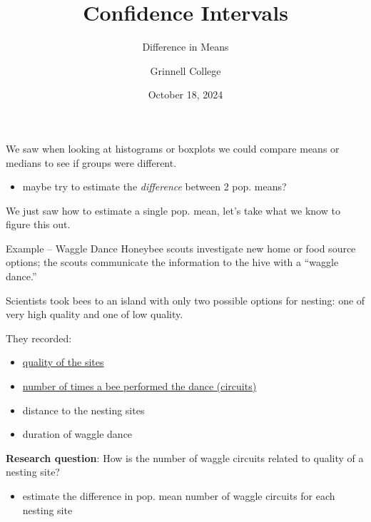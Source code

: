 \documentclass{beamer}
\title[STAT-209]{Confidence Intervals}
\subtitle{Difference in Means}
\author{Grinnell College}
\date{October 18, 2024}
\begin{document}
\begin{frame}
  \titlepage
\end{frame}

\begin{frame}
We saw when looking at histograms or boxplots we could compare means or medians to see if groups were different.
\begin{itemize}
    \item maybe try to estimate the \textit{difference} between 2 pop. means?
\end{itemize}
\vspace{15mm}

We just saw how to estimate a single pop. mean, let's take what we know to figure this out.
\end{frame}

\begin{frame}{Example -- Waggle Dance}
Honeybee scouts investigate new home or food source options; the scouts communicate the
information to the hive with a “waggle dance.”
\vspace{3mm}

Scientists took bees to an island with only two possible options for nesting: one of very high quality and one of low quality.
\vspace{3mm}

They recorded:
\begin{itemize}
    \item \underline{quality of the sites}
    \item \underline{number of times a bee performed the dance (circuits)}
    \item distance to the nesting sites
    \item duration of waggle dance
\end{itemize} \vspace{3mm}

\textbf{Research question}: How is the number of waggle circuits related to quality of a nesting site?
\begin{itemize}
    \item estimate the difference in pop. mean number of waggle circuits for each nesting site
\end{itemize}
\end{frame}
\end{document}
